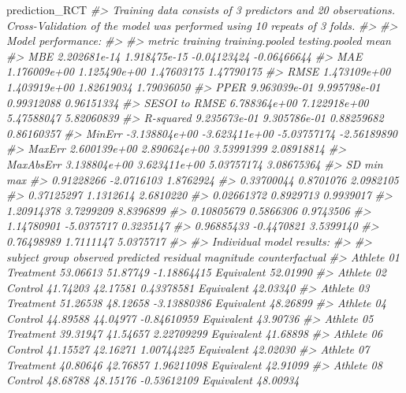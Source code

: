 \documentclass[
]{book}
\newenvironment{Shaded}{\begin{snugshade}}{\end{snugshade}}
\newcommand{\CommentTok}[1]{\textcolor[rgb]{0.56,0.35,0.01}{\textit{#1}}}
\newcommand{\NormalTok}[1]{#1}
\begin{document}
\begin{Shaded}
\begin{Highlighting}[]
\NormalTok{prediction\_RCT}
\CommentTok{\#> Training data consists of 3 predictors and 20 observations. Cross{-}Validation of the model was performed using 10 repeats of 3 folds.}
\CommentTok{\#> }
\CommentTok{\#> Model performance:}
\CommentTok{\#> }
\CommentTok{\#>         metric      training training.pooled testing.pooled        mean}
\CommentTok{\#>            MBE  2.202681e{-}14    1.918475e{-}15    {-}0.04123424 {-}0.06466644}
\CommentTok{\#>            MAE  1.176009e+00    1.125490e+00     1.47603175  1.47790175}
\CommentTok{\#>           RMSE  1.473109e+00    1.403919e+00     1.82619034  1.79036050}
\CommentTok{\#>           PPER  9.963039e{-}01    9.995798e{-}01     0.99312088  0.96151334}
\CommentTok{\#>  SESOI to RMSE  6.788364e+00    7.122918e+00     5.47588047  5.82060839}
\CommentTok{\#>      R{-}squared  9.235673e{-}01    9.305786e{-}01     0.88259682  0.86160357}
\CommentTok{\#>         MinErr {-}3.138804e+00   {-}3.623411e+00    {-}5.03757174 {-}2.56189890}
\CommentTok{\#>         MaxErr  2.600139e+00    2.890624e+00     3.53991399  2.08918814}
\CommentTok{\#>      MaxAbsErr  3.138804e+00    3.623411e+00     5.03757174  3.08675364}
\CommentTok{\#>          SD        min       max}
\CommentTok{\#>  0.91228266 {-}2.0716103 1.8762924}
\CommentTok{\#>  0.33700044  0.8701076 2.0982105}
\CommentTok{\#>  0.37125297  1.1312614 2.6810220}
\CommentTok{\#>  0.02661372  0.8929713 0.9939017}
\CommentTok{\#>  1.20914378  3.7299209 8.8396899}
\CommentTok{\#>  0.10805679  0.5866306 0.9743506}
\CommentTok{\#>  1.14780901 {-}5.0375717 0.3235147}
\CommentTok{\#>  0.96885433 {-}0.4470821 3.5399140}
\CommentTok{\#>  0.76498989  1.7111147 5.0375717}
\CommentTok{\#> }
\CommentTok{\#> Individual model results:}
\CommentTok{\#> }
\CommentTok{\#>     subject     group observed predicted    residual  magnitude counterfactual}
\CommentTok{\#>  Athlete 01 Treatment 53.06613  51.87749 {-}1.18864415 Equivalent       52.01990}
\CommentTok{\#>  Athlete 02   Control 41.74203  42.17581  0.43378581 Equivalent       42.03340}
\CommentTok{\#>  Athlete 03 Treatment 51.26538  48.12658 {-}3.13880386 Equivalent       48.26899}
\CommentTok{\#>  Athlete 04   Control 44.89588  44.04977 {-}0.84610959 Equivalent       43.90736}
\CommentTok{\#>  Athlete 05 Treatment 39.31947  41.54657  2.22709299 Equivalent       41.68898}
\CommentTok{\#>  Athlete 06   Control 41.15527  42.16271  1.00744225 Equivalent       42.02030}
\CommentTok{\#>  Athlete 07 Treatment 40.80646  42.76857  1.96211098 Equivalent       42.91099}
\CommentTok{\#>  Athlete 08   Control 48.68788  48.15176 {-}0.53612109 Equivalent       48.00934}

\end{Highlighting}
\end{Shaded}
\end{document}
